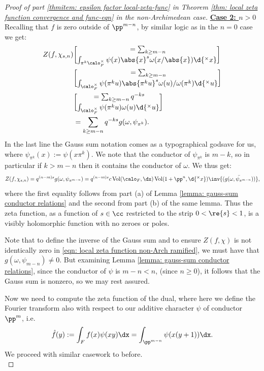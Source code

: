 \documentclass[11pt, x11names, openany]{book}
\begin{document}
\begin{proof}[Proof of part \ref{thmitem: epsilon factor local-zeta-func} in Theorem \ref{thm: local zeta function convergence and func-eqn} in the non-Archimedean case]
\underline{\textbf{Case 2: $n > 0$}}\\
Recalling that $f$ is zero outside of $\pp^{m-n}$, by similar logic as in the $n=0$ case we get:
\begin{align*}
    Z(f, \chi_{s, n}) &= \sum_{k \geq m-n} \brack{ \int_{\pi^k \calo_F^\times} \psi(x) \abs{x}^s \omega(x/\abs{x}) \d{^\times x}}\\
    &= \sum_{k \geq m-n} \brack{ \int_{\calo_F^\times} \psi(\pi^k u)  \abs{\pi^k u}^s \omega(u)/\omega(\pi^k) \d{^\times  u}}\\
    &= \sum_{k \geq m-n} q^{-ks} \brack{\int_{\calo_F^\times} \psi(\pi^k u) \omega(u) \d{^\times  u}}\\
    &= \sum_{k \geq m-n}q^{-ks}g(\omega, \psi_{\pi^k}).
\end{align*}
In the last line the Gauss sum notation comes as a typographical godsave for us, where $\psi_{\pi^k}(x) := \psi(x \pi^k)$. We note that the conductor of $\psi_{\pi^k}$ is $m-k$, so in particular if $k > m - n$ then it contains the conductor of $\omega$. We thus get:
\begin{equation}
\label{eqn: local zeta function non-Arch ramified}
    Z(f, \chi_{s, n}) = q^{(n-m)s} g(\omega, \psi_{\pi^{m-n}}) = q^{(n-m)s} c \vol(\calo_F, \dx) \vol(1 + \pp^n, \d{^\times x}) \inv{(\bar{g(\omega, \psi_{\pi^{m -n}})})},
\end{equation}
where the first equality follows from part (a) of Lemma \ref{lemma: gauss-sum conductor relations} and the second from part (b) of the same lemma. Thus the zeta function, as a function of $s \in \cc$ restricted to the strip $0 < \re{s} < 1$, is a visibly holomorphic function with no zeroes or poles.


\begin{sanitycheck}
Note that to define the inverse of the Gauss sum and to ensure $Z(f, \chi)$ is not identically zero in \ref{eqn: local zeta function non-Arch ramified}, we must have that $g(\omega, \psi_{m-n}) \neq 0$. But examining Lemma \ref{lemma: gauss-sum conductor relations}, since the conductor of $\psi$ is $m-n < n$, (since $n \geq 0$), it follows that the Gauss sum is nonzero, so we may rest assured.
\end{sanitycheck}

Now we need to compute the zeta function of the dual, where here we define the Fourier transform also with respect to our additive character $\psi$ of conductor $\pp^m$, i.e.
\begin{equation}
\label{eqn: non-Arch Fourier transform integral}
    \hat{f}(y) := \int_F f(x)\psi(xy) \dx = \int_{\pp^{m-n}} \psi(x(y+1)) \dx. 
\end{equation}
We proceed with similar casework to before.\\


\end{proof}
\end{document}
